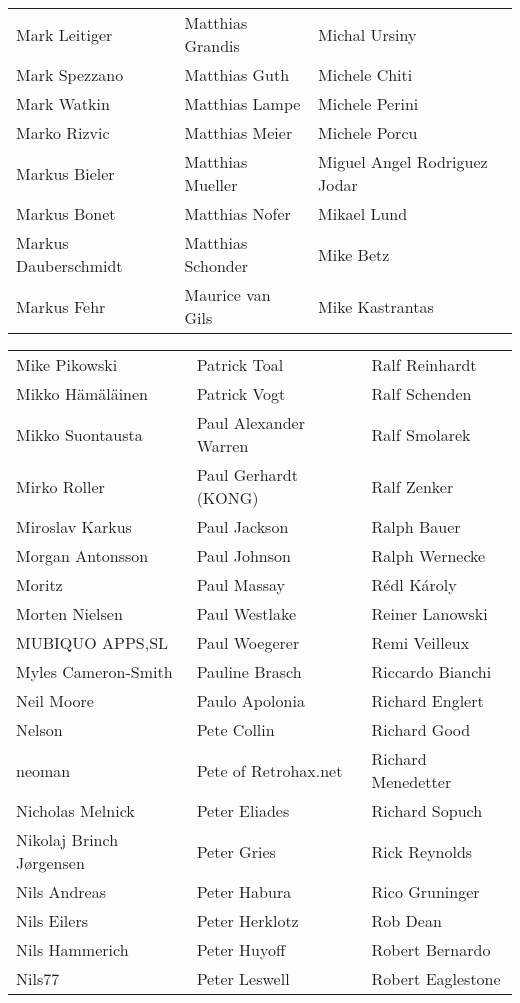\begin{tabular}{p{4.5cm}p{4.5cm}p{4.5cm}}
Mark Leitiger & Matthias Grandis & Michal Ursiny \\
Mark Spezzano & Matthias Guth & Michele Chiti \\
Mark Watkin & Matthias Lampe & Michele Perini \\
Marko Rizvic & Matthias Meier & Michele Porcu \\
Markus Bieler & Matthias Mueller & Miguel Angel Rodriguez Jodar \\
Markus Bonet & Matthias Nofer & Mikael Lund \\
Markus Dauberschmidt & Matthias Schonder & Mike Betz \\
Markus Fehr & Maurice van Gils & Mike Kastrantas \\
\end{tabular}
\newpage
\setlength{\tabcolsep}{1mm}
\begin{tabular}{p{4.5cm}p{4.5cm}p{4.5cm}}
Mike Pikowski & Patrick Toal & Ralf Reinhardt \\
Mikko Hämäläinen & Patrick Vogt & Ralf Schenden \\
Mikko Suontausta & Paul Alexander Warren & Ralf Smolarek \\
Mirko Roller & Paul Gerhardt (KONG) & Ralf Zenker \\
Miroslav Karkus & Paul Jackson & Ralph Bauer \\
Morgan Antonsson & Paul Johnson & Ralph Wernecke \\
Moritz & Paul Massay & Rédl Károly \\
Morten Nielsen & Paul Westlake & Reiner Lanowski \\
MUBIQUO APPS,SL & Paul Woegerer & Remi Veilleux \\
Myles Cameron-Smith & Pauline Brasch & Riccardo Bianchi \\
Neil Moore & Paulo Apolonia & Richard Englert \\
Nelson & Pete Collin & Richard Good \\
neoman & Pete of Retrohax.net & Richard Menedetter \\
Nicholas Melnick & Peter Eliades & Richard Sopuch \\
Nikolaj Brinch Jørgensen & Peter Gries & Rick Reynolds \\
Nils Andreas & Peter Habura & Rico Gruninger \\
Nils Eilers & Peter Herklotz & Rob Dean \\
Nils Hammerich & Peter Huyoff & Robert Bernardo \\
Nils77 & Peter Leswell & Robert Eaglestone \\

\end{tabular}
